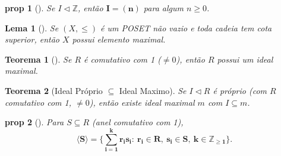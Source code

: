 \documentclass[11pt]{article}
\newcommand{\defname}[1]{\colorbox{yellow!30}{\strut \textbf{#1}}}
\newtheorem*{theorem}{Teorema}
\newtheorem*{proposition}{prop}
\newtheorem*{lemma}{Lema}
\theoremstyle{definition}
\begin{document}
\begin{multicols}{3}
\begin{proposition}[\defname{Ideais de \(\mathbb{Z}\)}]
Se \(I\triangleleft \mathbb{Z}\), então \(\mathbf{I=(n)}\) para algum \(n\ge 0\).
\end{proposition}

\begin{lemma}[\defname{Lema de Zorn}]
Se \((X,\le)\) é um POSET não vazio e toda cadeia tem cota superior, então \(X\) possui elemento maximal.
\end{lemma}

\begin{theorem}[\defname{Existência de Ideal Maximal}]
Se \(R\) é comutativo com 1 (\(\neq 0\)), então \(R\) possui um ideal maximal.
\end{theorem}

\begin{theorem}[Ideal Próprio $\subseteq$ Ideal Maximo]
Se \(I\triangleleft R\) é próprio (com $R$ comutativo com 1, \(\neq 0\)), então existe ideal maximal \(m\) com \(I\subseteq m\).
\end{theorem}

\begin{proposition}[\defname{Forma Explícita do Ideal Gerado}]
Para \(S\subseteq R\) (anel comutativo com 1),
\[
\mathbf{\langle S\rangle=\bigl\{\sum_{i=1}^k r_i s_i:\ r_i\in R,\ s_i\in S,\ k\in\mathbb{Z}_{\ge 1}\bigr\}}.
\]
\end{proposition}
\end{multicols}
\newpage
\end{document}
